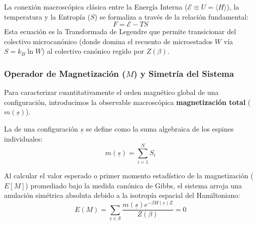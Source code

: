 \begin{prop}
    La conexión macroscópica clásica entre la Energía Interna ($\mathcal{E} \equiv U = \langle H \rangle$), la temperatura y la Entropía ($S$) se formaliza a través de la relación fundamental:
    \[
    F = \mathcal{E} - TS
    \]
    Esta ecuación es la Transformada de Legendre que permite transicionar del colectivo microcanónico (donde domina el recuento de microestados $W$ vía $S = k_B \ln W$) al colectivo canónico regido por $Z(\beta)$. 
\end{prop}

\subsubsection{Operador de Magnetización ($M$) y Simetría del Sistema}
\noindent 
Para caracterizar cuantitativamente el orden magnético global de una configuración, introducimos la observable macroscópica \textbf{magnetización total} ($m(\underline{s})$).

\begin{definicion}
    La  de una configuración $\underline{s}$ se define como la suma algebraica de los espines individuales:
    \begin{equation*}
        m(\underline{s}) = \sum_{i=1}^{N} S_i
    \end{equation*}
\end{definicion}
Al calcular el valor esperado o primer momento estadístico de la magnetización ($E[M]$) promediado bajo la medida canónica de Gibbs, el sistema arroja una anulación simétrica absoluta debido a la isotropía espacial del Hamiltoniano:
\begin{equation*}
    E(M) = \sum_{\underline{s} \in \mathcal{S}} \frac{m(\underline{s}) e^{-\beta H(\underline{s}) Z}}{Z(\beta)} = 0
\end{equation*}


